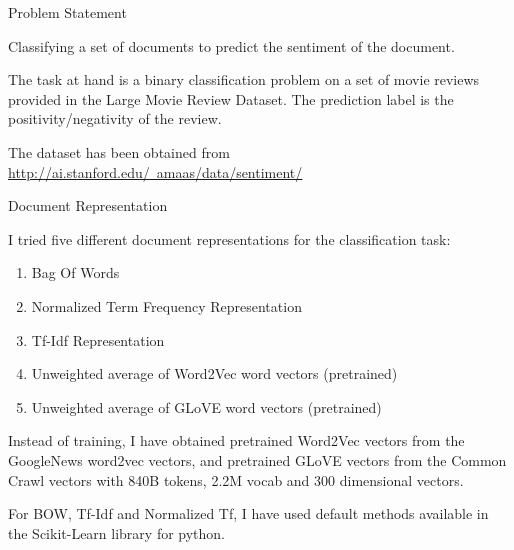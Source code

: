 \documentclass{article}
\begin{document}
\makeheader

\begin{qsection}{Problem Statement}

	Classifying a set of  documents  to  predict  the  sentiment  of  the  document.

	The task at hand is a binary classification problem on a set  of  movie  reviews provided in the Large  Movie  Review  Dataset.	 The  prediction  label  is  the positivity/negativity of the review.

	The dataset has been obtained from \href{http://ai.stanford.edu/~amaas/data/sentiment/}{http://ai.stanford.edu/~amaas/data/sentiment/}

\end{qsection}

\begin{qsection}{Document Representation}

	I tried five different document representations  for  the  classification  task:

	\begin{enumerate}
		\item Bag Of Words
		\item Normalized Term Frequency Representation
		\item Tf-Idf Representation
		\item Unweighted average of Word2Vec word vectors (pretrained)
		\item Unweighted average of GLoVE word vectors (pretrained)
	\end{enumerate}

	Instead of training, I have	obtained  pretrained  Word2Vec	vectors  from  the	GoogleNews	word2vec vectors, and pretrained GLoVE vectors from the	Common	Crawl  vectors	with 840B tokens, 2.2M vocab and 300 dimensional vectors.

	For BOW, Tf-Idf and Normalized Tf, I have used default methods available in the Scikit-Learn library for python.


\end{qsection}
\end{document}
